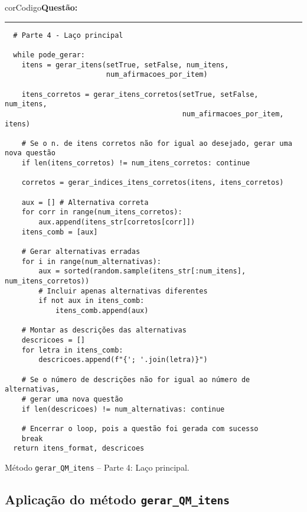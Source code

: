 \begin{listing}[!ht]
    \begin{myboxCode}{corCodigo}{\textbf{Questão: }}\vspace{3mm}
    \hrule
    \begin{verbatim}
  # Parte 4 - Laço principal

  while pode_gerar:
    itens = gerar_itens(setTrue, setFalse, num_itens, 
                        num_afirmacoes_por_item)

    itens_corretos = gerar_itens_corretos(setTrue, setFalse, num_itens,
                                          num_afirmacoes_por_item, itens)

    # Se o n. de itens corretos não for igual ao desejado, gerar uma nova questão
    if len(itens_corretos) != num_itens_corretos: continue

    corretos = gerar_indices_itens_corretos(itens, itens_corretos)

    aux = [] # Alternativa correta
    for corr in range(num_itens_corretos):
        aux.append(itens_str[corretos[corr]])
    itens_comb = [aux]

    # Gerar alternativas erradas
    for i in range(num_alternativas):
        aux = sorted(random.sample(itens_str[:num_itens], num_itens_corretos))
        # Incluir apenas alternativas diferentes
        if not aux in itens_comb:
            itens_comb.append(aux)

    # Montar as descrições das alternativas
    descricoes = []
    for letra in itens_comb:
        descricoes.append(f"{'; '.join(letra)}")

    # Se o número de descrições não for igual ao número de alternativas,
    # gerar uma nova questão
    if len(descricoes) != num_alternativas: continue

    # Encerrar o loop, pois a questão foi gerada com sucesso
    break
  return itens_format, descricoes
\end{verbatim}
\end{myboxCode}
\caption{Método \texttt{gerar\_QM\_itens} -- Parte 4: Laço principal.}
\label{lst:questaoQM_gerar_QM_itens_parte4}
\end{listing}

\subsection{Aplicação do método \texttt{gerar\_QM\_itens}}

